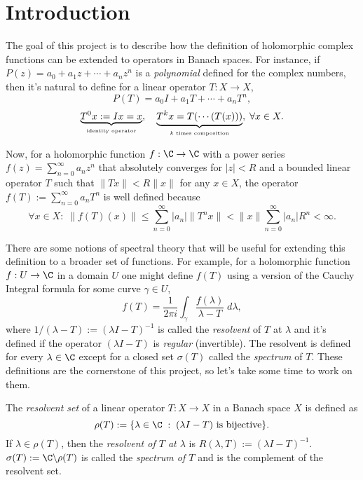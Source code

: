 
\section{Introduction}

The goal of this project is to describe how the definition of holomorphic complex functions can be extended to operators in Banach spaces. For instance, if $P(z) = a_0 + a_1 z +\cdots + a_n z^n$ is a \textit{polynomial} defined for the complex numbers, then it's natural to define for a linear operator $T : X \to X$,
\[ P(T) = a_0 I + a_1 T + \cdots + a_n T^n, \]
\[ \underbrace{T^0 x := I x = x}_{\mbox{\tiny identity operator}},\quad \underbrace{T^k x = T(\cdots(T(x)))}_{\mbox{\tiny $k$ times composition}},\; \forall x \in X. \]

Now, for a holomorphic function $f: \C \to \C$ with a power series $f(z) = \sum_{n = 0}^{\infty} a_n z^n$ that absolutely converges for $|z| < R$ and a bounded linear operator $T$ such that $\|Tx\| < R\|x\|$ for any $x \in X$, the operator $f(T) := \sum_{n = 0}^{\infty} a_n T^n$ is well defined because
\[ \forall x \in X:\; \|f(T)(x)\| \leq \sum_{n = 0}^{\infty} |a_n| \|T^n x\| < \|x\| \sum_{n = 0}^{\infty} |a_n| R^n < \infty. \tag*{$(\star)$}  \]

There are some notions of spectral theory that will be useful for extending this definition to a broader set of functions. For example, for a holomorphic function $f : U \to \C$ in a domain $U$ one might define $f(T)$ using a version of the Cauchy Integral formula for some curve $\gamma \in U$,
\[ f(T) = \frac{1}{2\pi i} \int_{\gamma} \frac{f(\lambda)}{\lambda - T} \; d \lambda, \]
where $1/(\lambda - T) := (\lambda I - T)^{-1}$ is called the \textit{resolvent} of $T$ at $\lambda$ and it's defined if the operator $(\lambda I - T)$ is \textit{regular} (invertible). The resolvent is defined for every $\lambda \in \C$ except for a closed set $\sigma(T)$ called the \textit{spectrum} of $T$. These definitions are the cornerstone of this project, so let's take some time to work on them.

\begin{definition} 
    The \textit{resolvent set} of a linear operator $T: X \to X$ in a Banach space $X$ is defined as
    \[ \rho(T) := \{\lambda \in \C \;:\; (\lambda I - T) \mbox{ is bijective}\}. \]
    If $\lambda \in \rho(T)$, then the \textit{resolvent of $T$ at $\lambda$} is $R(\lambda , T) := (\lambda I - T)^{-1}$. $\sigma(T) := \C \backslash \rho(T)$ is called the \textit{spectrum of $T$} and is the complement of the resolvent set.
\end{definition}

